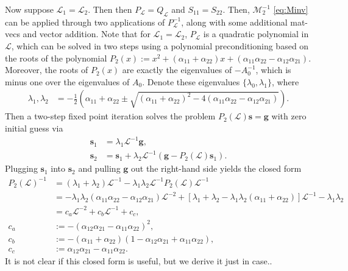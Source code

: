 \documentclass[a4paper,10pt]{article}
\begin{document}
Now suppose $\mathcal{L}_1 = \mathcal{L}_2$. Then then $P_{\mathcal{L}} = Q_{\mathcal{L}}$ and $S_{11} = S_{22}$.
Then, $\mathcal{M}_2^{-1}$ \eqref{eq:Minv} can be applied through two applications of $P_{\mathcal{L}}^{-1}$, along with
some additional mat-vecs and vector addition. Note that for $\mathcal{L}_1 = \mathcal{L}_2$, $P_{\mathcal{L}}$ is a
quadratic polynomial in $\mathcal{L}$, which can be solved in two steps using
a polynomial preconditioning based on the roots of the polynomial $P_2(x) := x^2 + (\alpha_{11} + \alpha_{22})x +
(\alpha_{11}\alpha_{22} - \alpha_{12}\alpha_{21})$. Moreover, the roots of $P_2(x)$ are exactly
the eigenvalues of $-A_0^{-1}$, which is minus one over the eigenvalues of $A_0$. Denote these
eigenvalues $\{\lambda_0,\lambda_1\}$, where
%
\begin{align*}
\lambda_1,\lambda_2 & = -\frac{1}{2} \left( \alpha_{11} + \alpha_{22} \pm \sqrt{ (\alpha_{11} + \alpha_{22})^2 - 4 ( \alpha_{11}\alpha_{22} - \alpha_{12}\alpha_{21})} \right).
\end{align*}
%
 Then a two-step fixed point iteration solves the problem
$P_2(\mathcal{L})\mathbf{s} = \mathbf{g}$ with zero initial guess via
%
\begin{align*}
\mathbf{s}_1 & = \lambda_1\mathcal{L}^{-1}\mathbf{g}, \\
\mathbf{s}_2 & = \mathbf{s}_1 + \lambda_2\mathcal{L}^{-1}( \mathbf{g} - P_2(\mathcal{L})\mathbf{s}_1).
\end{align*}
%
Plugging $\mathbf{s}_1$ into $\mathbf{s}_2$ and pulling $\mathbf{g}$ out the right-hand side yields
the closed form
%
\begin{align*}
P_2(\mathcal{L})^{-1} & = (\lambda_1+\lambda_2)\mathcal{L}^{-1}  - \lambda_1\lambda_2\mathcal{L}^{-1}P_2(\mathcal{L})\mathcal{L}^{-1} \\
& = -\lambda_1\lambda_2(\alpha_{11}\alpha_{22} - \alpha_{12}\alpha_{21})\mathcal{L}^{-2} +
	[\lambda_1+\lambda_2 - \lambda_1\lambda_2(\alpha_{11}+\alpha_{22})]\mathcal{L}^{-1} - \lambda_1\lambda_2 \\
& = c_a\mathcal{L}^{-2}+ c_b\mathcal{L}^{-1} + c_c, \\
c_a & := -(\alpha_{12}\alpha_{21} - \alpha_{11}\alpha_{22})^2, \\
c_b & := -(\alpha_{11} + \alpha_{22}) (1 - \alpha_{12}\alpha_{21} + \alpha_{11}\alpha_{22}), \\
c_c & := \alpha_{12}\alpha_{21} - \alpha_{11}\alpha_{22}.
\end{align*}
%
It is not clear if this closed form is useful, but we derive it just in case..
\end{document}
